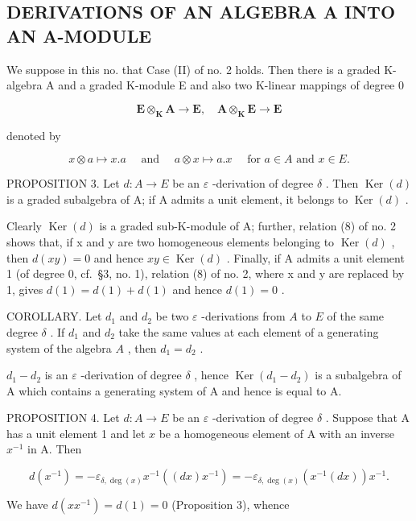 \subsection{DERIVATIONS OF AN ALGEBRA A INTO AN A-MODULE}

We suppose in this no. that Case (II) of no. 2 holds. Then there is a graded K-algebra A and a graded K-module E and also two K-linear mappings of degree 0

\[
\mathbf {E} \otimes_ {\mathbf {K}} \mathbf {A} \rightarrow \mathbf {E}, \quad \mathbf {A} \otimes_ {\mathbf {K}} \mathbf {E} \rightarrow \mathbf {E}
\]

denoted by

\[
x \otimes a \mapsto x. a \quad \text { and } \quad a \otimes x \mapsto a. x \quad \text { for   } a \in A \text {   and   } x \in E.
\]

PROPOSITION 3. Let \(d:A\to E\) be an \(\varepsilon\) -derivation of degree \(\delta\) . Then \(\operatorname{Ker}(d)\) is a graded subalgebra of A; if A admits a unit element, it belongs to \(\operatorname{Ker}(d)\) .

Clearly \(\operatorname{Ker}(d)\) is a graded sub-K-module of A; further, relation (8) of no. 2 shows that, if x and y are two homogeneous elements belonging to \(\operatorname{Ker}(d)\) , then \(d(xy) = 0\) and hence \(xy \in \operatorname{Ker}(d)\) . Finally, if A admits a unit element 1 (of degree 0, cf.~§3, no. 1), relation (8) of no. 2, where x and y are replaced by 1, gives \(d(1) = d(1) + d(1)\) and hence \(d(1) = 0\) .

COROLLARY. Let \(d_1\) and \(d_2\) be two \(\varepsilon\) -derivations from \(A\) to \(E\) of the same degree \(\delta\) . If \(d_1\) and \(d_2\) take the same values at each element of a generating system of the algebra \(A\) , then \(d_1 = d_2\) .

\(d_{1} - d_{2}\) is an \(\varepsilon\) -derivation of degree \(\delta\) , hence \(\operatorname{Ker}(d_1 - d_2)\) is a subalgebra of A which contains a generating system of A and hence is equal to A.

PROPOSITION 4. Let \(d:A\to E\) be an \(\varepsilon\) -derivation of degree \(\delta\) . Suppose that A has a unit element 1 and let \(x\) be a homogeneous element of A with an inverse \(x^{-1}\) in A. Then

\[
d (x ^ {- 1}) = - \varepsilon_ {\delta , \deg (x)} x ^ {- 1} ((d x) x ^ {- 1}) = - \varepsilon_ {\delta , \deg (x)} (x ^ {- 1} (d x)) x ^ {- 1}.\tag{19}
\]

We have \(d(xx^{-1}) = d(1) = 0\) (Proposition 3), whence

